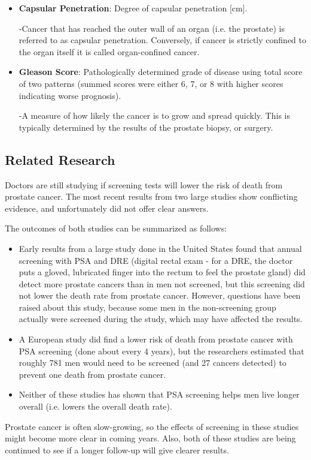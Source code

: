 \begin{itemize}
	\item \textbf{Capsular Penetration}: Degree of capsular penetration [cm]. \par
		-Cancer that has reached the outer wall of an organ (i.e. the prostate) is referred to as capsular penetration. Conversely, if cancer is strictly confined to the organ itself it is called organ-confined cancer.
		
	\item \textbf{Gleason Score}: Pathologically determined grade of disease using total score of two patterns (summed scores were either 6, 7, or 8 with higher scores indicating worse prognosis). \par
		-A measure of how likely the cancer is to grow and spread quickly. This is typically determined by the results of the prostate biopsy, or surgery.
\end{itemize}

\subsection{Related Research}
Doctors are still studying if screening tests will lower the risk of death from prostate cancer. The most recent results from two large studies show conflicting evidence, and unfortunately did not offer clear answers. \par
The outcomes of both studies can be summarized as follows:

\begin{itemize}
\item Early results from a large study done in the United States found that annual screening with PSA and DRE (digital rectal exam - for a DRE, the doctor puts a gloved, lubricated finger into the rectum to feel the prostate gland) did detect more prostate cancers than in men not screened, but this screening did not lower the death rate from prostate cancer. However, questions have been raised about this study, because some men in the non-screening group actually were screened during the study, which may have affected the results.

\item A European study did find a lower risk of death from prostate cancer with PSA screening (done about every 4 years), but the researchers estimated that roughly 781 men would need to be screened (and 27 cancers detected) to prevent one death from prostate cancer.

\item Neither of these studies has shown that PSA screening helps men live longer overall (i.e. lowers the overall death rate).
\end{itemize}

Prostate cancer is often slow-growing, so the effects of screening in these studies might become more clear in coming years. Also, both of these studies are being continued to see if a longer follow-up will give clearer results.


